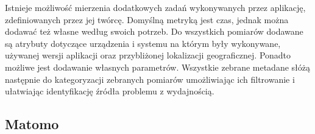 Istnieje możliwość mierzenia dodatkowych zadań wykonywanych przez aplikację, zdefiniowanych przez jej twórcę. Domyślną metryką jest czas, jednak można dodawać też własne według swoich potrzeb. Do wszystkich pomiarów dodawane są atrybuty dotyczące urządzenia i systemu na którym były wykonywane, używanej wersji aplikacji oraz przybliżonej lokalizacji geograficznej. Ponadto możliwe jest dodawanie własnych parametrów. Wszystkie zebrane metadane słóżą następnie do kategoryzacji zebranych pomiarów umożliwiając ich  filtrowanie i ułatwiając identyfikację źródła problemu z wydajnością.

\subsection{Matomo}

